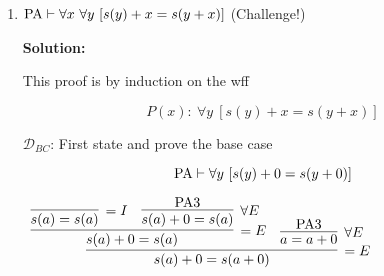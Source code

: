 \documentclass[11pt]{report}
\begin{document}
\begin{enumerate}
\begin{enumerate}
		See over the page for these steps combined with the disjunction elimination to complete the proof of the induction step. 
		
		\begin{sidewaysfigure}

			$$ \PA, \ [n = 0 \lor \exists y (n = s(y))] \ \vdash \ [s(n) = 0 \lor \exists y (s(n) = s(y))]$$

			\begin{mdframed}
				\begin{center}
					\small{$\begin{array}{c}
						\infer[\lor E]{[(s(n)=0) \lor \exists y \ (s(n)=s(y))]}
							{\infer[\IH]{n=0 \lor \exists y \ (n = s(y))}{}
							&
							\infer[\to I,1]{(n=0) \to [(s(n)=0) \lor \exists y \ (s(n)=s(y))]}
								{\infer[\lor I]{(s(n)=0) \lor \exists y \ (s(n)=s(y))}
									{\infer[\exists I]{\exists y \ (s(n)=s(y))}
										{\infer[\MP]{s(n)=s(0)}
											{\infer[\THM]{n=0 \to s(n)=s(0)}{}
											&
											\infer[1]{\cancel{n=0}}{}}}}}
							&
							\infer[\to I,2]{\exists y \ (n=s(y)) \to [(s(n)=0) \lor \exists y \ (s(n)=s(y))]}
								{\infer[\exists E]{(s(n)=0) \lor \exists y \ (s(n)=s(y))}
									{\infer[2]{\cancel{\exists y \ (n=s(y))}}{}
									&
									\infer[\to I,3]{n=s(w) \to [(s(n)=0) \lor \exists y \ (s(n)=s(y))]}
										{\infer[\lor I]{(s(n)=0) \lor \exists y \ (s(n)=s(y))}
											{\infer[\exists I]{\exists y \ (s(n)=s(y))}
												{\infer[\MP]{s(n)=s(s(w))}
													{\infer[3]{\cancel{n=s(w)}}{}
													&
													\infer[\THM]{(n=s(w)) \to (s(n)=s(s(w)))}
														{}
													}}}}}}}
					\end{array}$}
				\end{center}
			\end{mdframed}
		\end{sidewaysfigure}

		
		\newpage
		\item $\PA \vdash \forall x \ \forall y \ [s(y) + x = s(y+x)]$ \hspace{5cm} (Challenge!)

		{\bf Solution:} 

		This proof is by induction on the wff 

		$$ P(x) : \ \forall y \ [s(y) + x = s(y+x)]$$

		$\mathcal{D}_{BC}$: First state and prove the base case 

		$$ \text{PA} \vdash \forall y \ [s(y) + 0 = s(y+0)]$$

		\begin{mdframed}
			\begin{center}
				$\begin{array}{c}
					\infer[=E]{s(a) + 0 = s(a + 0)}
						{\infer[=E]{s(a) + 0 = s(a)}
							{\infer[=I]{s(a)=s(a)}{}
							&
							\infer[\forall E]{s(a)+0=s(a)}{\PA 3}}
						&
						\infer[\forall E]{a = a + 0}{\PA 3}}
				\end{array}$
			\end{center}
		\end{mdframed}


\end{enumerate}
\end{enumerate}
\end{document}

